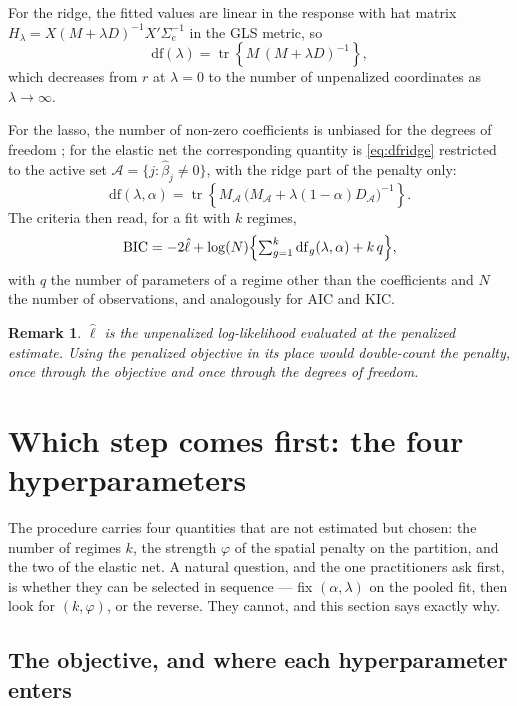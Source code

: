 \documentclass[11pt,a4paper]{article}
\newtheorem{remark}{Remark}
\DeclareMathOperator{\tr}{tr}
\newcommand{\Sig}{\Sigma}
\newcommand{\Se}{\Sig_{e}}
\begin{document}
For the ridge, the fitted values are linear in the response with hat matrix
$H_\lambda = X(M+\lambda D)^{-1}X'\Se^{-1}$ in the GLS metric, so
\begin{equation}
  \mathrm{df}(\lambda) = \tr\!\left\{ M\,(M+\lambda D)^{-1} \right\},
  \label{eq:dfridge}
\end{equation}
which decreases from $r$ at $\lambda = 0$ to the number of unpenalized
coordinates as $\lambda\to\infty$.

For the lasso, the number of non-zero coefficients is unbiased for the degrees
of freedom \citep{ZouHastieTibshirani2007}; for the elastic net the
corresponding quantity is \eqref{eq:dfridge} restricted to the active set
$\mathcal{A} = \{j : \hat\beta_j \ne 0\}$, with the ridge part of the penalty
only:
\begin{equation}
  \mathrm{df}(\lambda,\alpha) =
  \tr\!\left\{ M_{\mathcal{A}}\,
    \bigl(M_{\mathcal{A}} + \lambda(1-\alpha)D_{\mathcal{A}}\bigr)^{-1}\right\}.
  \label{eq:dfen}
\end{equation}
The criteria then read, for a fit with $k$ regimes,
\[
  \mathrm{BIC} = -2\hat\ell + \log(N)\Bigl\{
    \textstyle\sum_{g=1}^{k}\mathrm{df}_g(\lambda,\alpha) + k\,q \Bigr\},
\]
with $q$ the number of parameters of a regime other than the coefficients and
$N$ the number of observations, and analogously for AIC and KIC.

\begin{remark}
$\hat\ell$ is the \emph{unpenalized} log-likelihood evaluated at the penalized
estimate. Using the penalized objective in its place would double-count the
penalty, once through the objective and once through the degrees of freedom.
\end{remark}

\section{Which step comes first: the four hyperparameters}
\label{sec:order}

The procedure carries four quantities that are not estimated but chosen: the
number of regimes $k$, the strength $\varphi$ of the spatial penalty on the
partition, and the two of the elastic net. A natural question, and the one
practitioners ask first, is whether they can be selected in sequence --- fix
$(\alpha,\lambda)$ on the pooled fit, then look for $(k,\varphi)$, or the
reverse. They cannot, and this section says exactly why.

\subsection{The objective, and where each hyperparameter enters}
\end{document}
